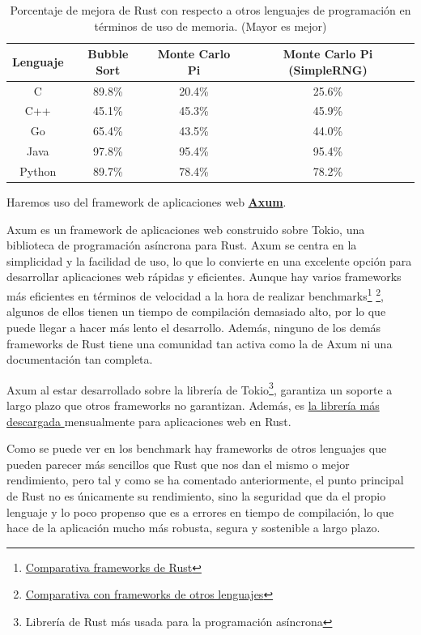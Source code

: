\begin{table}[h!]
\centering
\begin{tabular}{|c|c|c|c|}
\hline
\textbf{Lenguaje} & \textbf{Bubble Sort} & \textbf{Monte Carlo Pi} & \textbf{Monte Carlo Pi (SimpleRNG)} \\
\hline
C      & 89.8\%  & 20.4\%  & 25.6\%  \\
C++    & 45.1\%  & 45.3\%  & 45.9\%  \\
Go     & 65.4\%  & 43.5\%  & 44.0\%  \\
Java   & 97.8\%  & 95.4\%  & 95.4\%  \\
Python & 89.7\%  & 78.4\%  & 78.2\%  \\
\hline
\end{tabular}
\caption{Porcentaje de mejora de Rust con respecto a otros lenguajes de programación en términos de uso de memoria. (Mayor es mejor)}
\end{table}

Haremos uso del framework de aplicaciones web \href{https://github.com/tokio-rs/axum?tab=readme-ov-file}{\textbf{Axum}}.

Axum es un framework de aplicaciones web construido sobre Tokio, una biblioteca de programación asíncrona para Rust. Axum se centra en la simplicidad y la facilidad de uso, lo que lo convierte en una excelente opción para desarrollar aplicaciones web rápidas y eficientes.
Aunque hay varios frameworks más eficientes en términos de velocidad a la hora de realizar benchmarks\footnote{\href{https://web-frameworks-benchmark.netlify.app/result?l=rust}{Comparativa frameworks de Rust}} \footnote{\href{https://www.techempower.com/benchmarks/\#section=data-r21&test=composite&hw=ph}{Comparativa con frameworks de otros lenguajes}}, algunos de ellos tienen un tiempo de compilación demasiado alto, por lo que puede llegar a hacer más lento el desarrollo.
Además, ninguno de los demás frameworks de Rust tiene una comunidad tan activa como la de Axum ni una documentación tan completa.

Axum al estar desarrollado sobre la librería de Tokio\footnote{Librería de Rust más usada para la programación asíncrona}, garantiza un soporte a largo plazo que otros frameworks no garantizan. Además, es \href{https://lib.rs/crates/axum}{la librería más descargada }mensualmente para aplicaciones web en Rust.  

Como se puede ver en los benchmark hay frameworks de otros lenguajes que pueden parecer más sencillos que Rust que nos dan el mismo o mejor rendimiento, pero tal y como se ha comentado anteriormente, el punto principal de Rust no es únicamente su rendimiento, sino la seguridad que da el propio lenguaje y lo poco propenso que es a errores en tiempo de compilación, lo que hace de la aplicación mucho más robusta, segura y sostenible a largo plazo.


